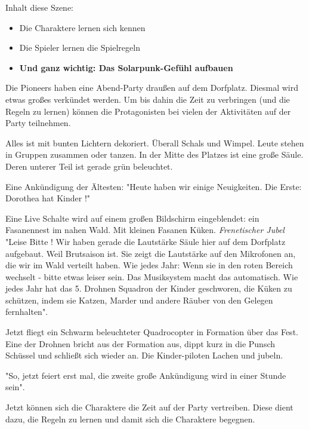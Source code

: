 Inhalt diese Szene:
\begin{itemize}
\item Die Charaktere lernen sich kennen
\item Die Spieler lernen die Spielregeln
\item \textbf{Und ganz wichtig: Das Solarpunk-Gefühl aufbauen}
\end{itemize}

Die Pioneers haben eine Abend-Party draußen auf dem Dorfplatz. Diesmal wird etwas großes verkündet werden. Um bis dahin die Zeit zu verbringen (und die Regeln zu lernen) können die Protagonisten bei vielen der Aktivitäten auf der Party teilnehmen.

Alles ist mit bunten Lichtern dekoriert. Überall Schals und Wimpel. Leute stehen in Gruppen zusammen oder tanzen. In der Mitte des Platzes ist eine große Säule. Deren unterer Teil ist gerade grün beleuchtet.

Eine Ankündigung der Ältesten: "Heute haben wir einige Neuigkeiten. Die Erste: Dorothea hat Kinder !"

Eine Live Schalte wird auf einem großen Bildschirm eingeblendet: ein Fasanennest im nahen Wald. Mit kleinen Fasanen Küken. \textit{Frenetischer Jubel} "Leise Bitte ! Wir haben gerade die Lautstärke Säule hier auf dem Dorfplatz aufgebaut. Weil Brutsaison ist. Sie zeigt die Lautstärke auf den Mikrofonen an, die wir im Wald verteilt haben. Wie jedes Jahr: Wenn sie in den roten Bereich wechselt - bitte etwas leiser sein. Das Musiksystem macht das automatisch. Wie jedes Jahr hat das 5. Drohnen Squadron der Kinder geschworen, die Küken zu schützen, indem sie Katzen, Marder und andere Räuber von den Gelegen fernhalten".

Jetzt fliegt ein Schwarm beleuchteter Quadrocopter in Formation über das Fest. Eine der Drohnen bricht aus der Formation aus, dippt kurz in die Punsch Schüssel und schließt sich wieder an. Die Kinder-piloten Lachen und jubeln.

"So, jetzt feiert erst mal, die zweite große Ankündigung wird in einer Stunde sein".

Jetzt können sich die Charaktere die Zeit auf der Party vertreiben. Diese dient dazu, die Regeln zu lernen und damit sich die Charaktere begegnen.

